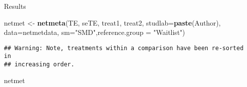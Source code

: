 \documentclass[]{book}
\newenvironment{Shaded}{\begin{snugshade}}{\end{snugshade}}
\newcommand{\KeywordTok}[1]{\textcolor[rgb]{0.13,0.29,0.53}{\textbf{#1}}}
\newcommand{\DataTypeTok}[1]{\textcolor[rgb]{0.13,0.29,0.53}{#1}}
\newcommand{\StringTok}[1]{\textcolor[rgb]{0.31,0.60,0.02}{#1}}
\newcommand{\NormalTok}[1]{#1}
\theoremstyle{definition}
\theoremstyle{definition}
\theoremstyle{definition}
\theoremstyle{remark}
\begin{document}
Results

\begin{Shaded}
\begin{Highlighting}[]
\NormalTok{netmet <-}\StringTok{ }\KeywordTok{netmeta}\NormalTok{(TE, seTE, treat1, treat2, }\DataTypeTok{studlab=}\KeywordTok{paste}\NormalTok{(Author), }\DataTypeTok{data=}\NormalTok{netmetdata, }\DataTypeTok{sm=}\StringTok{"SMD"}\NormalTok{,}\DataTypeTok{reference.group =} \StringTok{"Waitlist"}\NormalTok{)}
\end{Highlighting}
\end{Shaded}

\begin{verbatim}
## Warning: Note, treatments within a comparison have been re-sorted in
## increasing order.
\end{verbatim}

\begin{Shaded}
\begin{Highlighting}[]
\NormalTok{netmet}
\end{Highlighting}
\end{Shaded}
\end{document}

